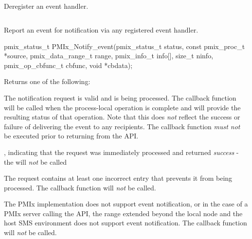 Deregister an event handler.

\subsection{}

\summary

Report an event for notification via any
registered event handler.

\format

\cspecificstart
\begin{codepar}
pmix_status_t
PMIx_Notify_event(pmix_status_t status,
                  const pmix_proc_t *source,
                  pmix_data_range_t range,
                  pmix_info_t info[], size_t ninfo,
                  pmix_op_cbfunc_t cbfunc, void *cbdata);
\end{codepar}
\cspecificend

\begin{arglist}
\end{arglist}

Returns one of the following:
\begin{constantdesc}
\item {} The notification request is valid and is being processed. The callback function will be called when the process-local operation is complete and will provide the resulting status of that operation. Note that this does \textit{not} reflect the success or failure of delivering the event to any recipients. The callback function \emph{must not} be executed prior to returning from the \ac{API}.
\item {}, indicating that the request was immediately processed and returned \textit{success} - the  will \textit{not} be called
\item {} The request contains at least one incorrect entry that prevents it from being processed. The callback function will \textit{not} be called.
\item {} The \ac{PMIx} implementation does not support event notification, or in the case of a \ac{PMIx} server calling the API, the range extended beyond the local node and the host \ac{SMS} environment does not support event notification. The callback function will \textit{not} be called.
\end{constantdesc}

